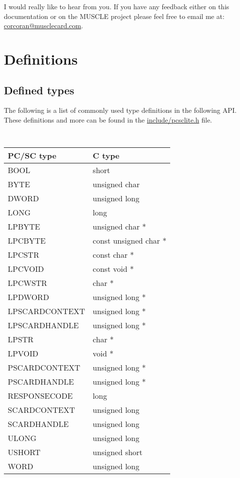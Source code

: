 \documentclass[a4paper,12pt]{article}
\begin{document}
I would really like to hear from you. If you have any feedback either on
this documentation or on the MUSCLE project please feel free to email me
at: \url{corcoran@musclecard.com}.


\section{Definitions}


\subsection{Defined types}

The following is a list of commonly used type definitions in the
following API. These definitions and more can be found in the
\url{include/pcsclite.h} file.

{\tt
\begin{longtable}{|l|l|}
\hline
\textrm{PC/SC type} & \textrm{C type} \\
\hline
\hline
BOOL  &  short \\
BYTE  &  unsigned char \\
DWORD  &  unsigned long \\
LONG  &  long \\
LPBYTE  &  unsigned char * \\
LPCBYTE  &  const unsigned char * \\
LPCSTR  &  const char * \\
LPCVOID  &  const void * \\
LPCWSTR  &  char * \\
LPDWORD  &  unsigned long * \\
LPSCARDCONTEXT & unsigned long * \\
LPSCARDHANDLE & unsigned long * \\
LPSTR  &  char * \\
LPVOID  &  void * \\
PSCARDCONTEXT & unsigned long * \\
PSCARDHANDLE & unsigned long * \\
RESPONSECODE & long \\
SCARDCONTEXT & unsigned long \\
SCARDHANDLE & unsigned long \\
ULONG  &  unsigned long \\
USHORT  &  unsigned short \\
WORD  &  unsigned long \\
\hline
\end{longtable}
}
\end{document}
